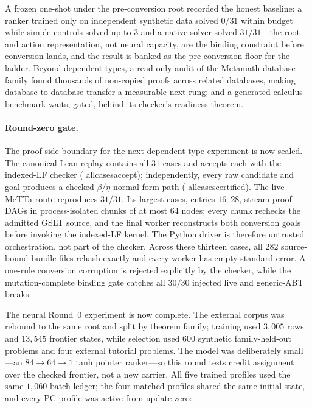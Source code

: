 \documentclass[11pt]{article}
\newcommand{\leanname}[1]{{\scriptsize\ttfamily
  \def\_{\textunderscore\allowbreak}#1}}
\begin{document}
A frozen one-shot under the pre-conversion root recorded the honest baseline: a ranker
trained only on independent synthetic data solved $0/31$ within budget while simple
controls solved up to $3$ and a native solver \cite{norman2026} solved $31/31$---the
root and action representation, not neural capacity, are the binding constraint before
conversion lands, and the result is banked as the pre-conversion floor for the ladder.
Beyond dependent types, a read-only audit of the Metamath database family found
thousands of non-copied proofs across related databases, making database-to-database
transfer a measurable next rung; and a generated-calculus benchmark waits, gated,
behind its checker's readiness theorem.

\paragraph{Round-zero gate.}
The proof-side boundary for the next dependent-type experiment is now sealed. The
canonical Lean replay contains all $31$ cases and accepts each with the indexed-LF
checker
(\leanname{all\_cases\_accept});
independently, every raw candidate and goal produces a checked $\beta/\eta$
normal-form path
(\leanname{all\_cases\_certified}).
The live MeTTa route reproduces $31/31$. Its largest cases, entries $16$--$28$,
stream proof DAGs in process-isolated chunks of at most $64$ nodes; every chunk
rechecks the admitted GSLT source, and the final worker reconstructs both conversion
goals before invoking the indexed-LF kernel. The Python driver is therefore untrusted
orchestration, not part of the checker. Across these thirteen cases, all $282$
source-bound bundle files rehash exactly and every worker has empty standard error.
A one-rule conversion corruption is rejected explicitly by the checker, while the
mutation-complete binding gate catches all $30/30$ injected live and generic-ABT
breaks.

The neural Round~0 experiment is now complete. The external corpus was rebound to the
same root and split by theorem family; training used $3{,}005$ rows and $13{,}545$
frontier states, while selection used $600$ synthetic family-held-out problems and four
external tutorial problems. The model was deliberately small---an
$84\!\to\!64\!\to\!1$ tanh pointer ranker---so this round tests credit assignment over
the checked frontier, not a new carrier. All five trained profiles used the same
$1{,}060$-batch ledger; the four matched profiles shared the same initial state, and
every PC profile was active from update zero:
\end{document}

